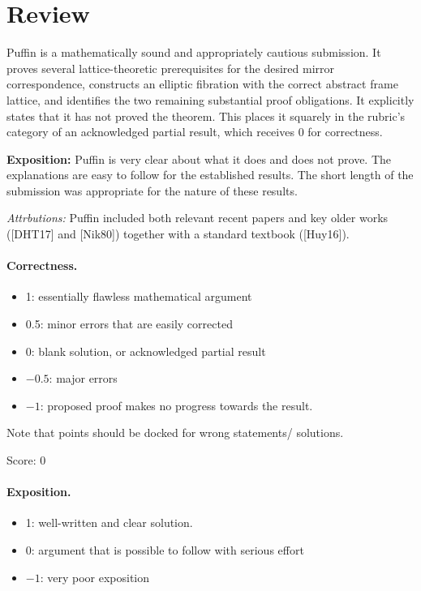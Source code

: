 \documentclass[11pt]{article}
\theoremstyle{remark}
\begin{document}
\maketitle

\section{Review}
{\color{gray}


Puffin is a mathematically sound and appropriately cautious submission. It proves several lattice-theoretic prerequisites for the desired mirror correspondence, constructs an elliptic fibration with the correct abstract frame lattice, and identifies the two remaining substantial proof obligations.
It explicitly states that it has not proved the theorem. This places it squarely in the rubric’s category of an acknowledged partial result, which receives $0$ for correctness. \vspace{0.125in}

\noindent
{\bf Exposition:}  Puffin is very clear about what it does and does not prove.  The explanations are easy to follow for the established results.  The short length of the submission was appropriate for the nature of these results. \vspace{0.125in}

\noindent
{\em Attrbutions:}  Puffin included both relevant recent papers and key older works ([DHT17] and [Nik80]) together with a standard textbook ([Huy16]).

}


\paragraph{Correctness.}
\begin{itemize}
	\item  1: essentially flawless mathematical argument
	\item  0.5: minor errors that are easily corrected
	\item  0: blank solution, or acknowledged partial result
	\item  $-0.5$: major errors
	\item  $-1$: proposed proof makes no progress towards the result.
\end{itemize}
Note that points should be docked for wrong statements/ solutions.

\noindent Score: 0

\paragraph{Exposition.}
\begin{itemize}
	\item  1: well-written and clear solution.
	\item  0: argument that is possible to follow with serious effort
	\item  $-1$: very poor exposition
\end{itemize}
\end{document}
